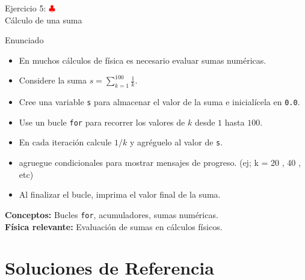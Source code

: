 \documentclass[10pt]{beamer}
\begin{document}
\begin{frame}{Ejercicio 5: \hfill \textcolor{red}{$\clubsuit$} \\ Cálculo de una suma}
  \begin{block}{Enunciado}
    \footnotesize
    \setlength{\itemsep}{0.12em}
    \setlength{\parskip}{0pt}
    \setlength{\parsep}{0pt}
    \setlength{\topsep}{0.2em}
    \begin{itemize}
      \item En muchos cálculos de física es necesario evaluar sumas numéricas.
      \item Considere la suma \( s = \sum_{k=1}^{100} \frac{1}{k} \).
      \item Cree una variable \texttt{s} para almacenar el valor de la suma e inicialícela en \texttt{0.0}.
      \item Use un bucle \texttt{for} para recorrer los valores de \(k\) desde \(1\) hasta \(100\).
      \item En cada iteración calcule \(1/k\) y agréguelo al valor de \texttt{s}.
      \item agruegue condicionales para mostrar mensajes de progreso. (ej; k = 20 , 40 , etc) 
      \item Al finalizar el bucle, imprima el valor final de la suma.
    \end{itemize}
  \end{block}
\vspace{-1.0em}
  \footnotesize
  \textbf{Conceptos:} Bucles \texttt{for}, acumuladores, sumas numéricas. \\
  \textbf{Física relevante:} Evaluación de sumas en cálculos físicos.
\end{frame}


\section{Soluciones de Referencia}
\end{document}
